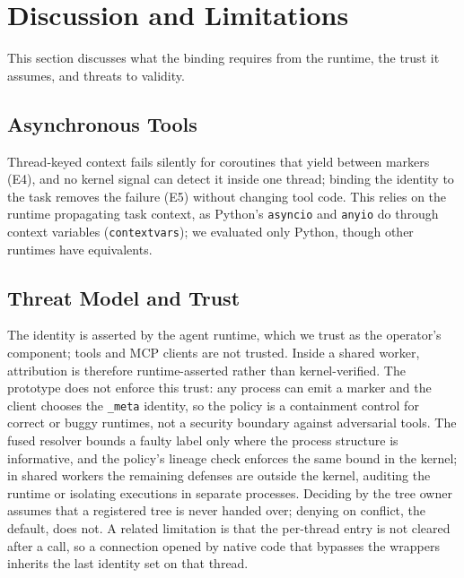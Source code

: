 \section{Discussion and Limitations}
\label{sec:discussion}
This section discusses what the binding requires from the runtime, the trust it assumes, and threats to validity.

\subsection{Asynchronous Tools}
 
 Thread-keyed context fails silently for coroutines that yield between markers (E4), and no kernel signal can detect it inside one thread; binding the identity to the task removes the failure (E5) without changing tool code. This relies on the runtime propagating task context, as Python's \texttt{asyncio} and \texttt{anyio} do through context variables (\texttt{contextvars}); we evaluated only Python, though other runtimes have equivalents.

\subsection{Threat Model and Trust}
The identity is asserted by the agent runtime, which we trust as the operator's component; tools and MCP clients are not trusted. Inside a shared worker, attribution is therefore runtime-asserted rather than kernel-verified. The prototype does not enforce this trust: any process can emit a marker and the client chooses the \texttt{\_meta} identity, so the policy is a containment control for correct or buggy runtimes, not a security boundary against adversarial tools. The fused resolver bounds a faulty label only where the process structure is informative, and the policy's lineage check enforces the same bound in the kernel; in shared workers the remaining defenses are outside the kernel, \eg auditing the runtime or isolating executions in separate processes. Deciding by the tree owner assumes that a registered tree is never handed over; denying on conflict, the default, does not. A related limitation is that the per-thread entry is not cleared after a call, so a connection opened by native code that bypasses the wrappers inherits the last identity set on that thread.


